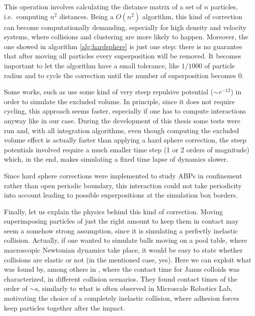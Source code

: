 \documentclass[../../master_thesis_np.tex]{subfiles}
\begin{document}
	This operation involves calculating the distance matrix of a set of $n$ particles, i.e.~computing $n^2$ distances. Being a $O(n^2)$ algorithm, this kind of correction can become computationally demanding, especially for high density and velocity systems, where collisions and clustering are more likely to happen. Moreover, the one showed in algorithm \ref{alg:hardsphere} is just one step: there is no guarantee that after moving all particles every superposition will be removed. It becomes important to let the algorithm have a small tolerance, like $1/1000$ of particle radius and to cycle the correction until the number of superposition becomes $0$.
	
	Some works, such as \cite{martin-gomez_collective_2018, caprini_spontaneous_2020} use some kind of very steep repulsive potential ($\sim r^{-12}$) in order to simulate the excluded volume. In principle, since it does not require cycling, this approach seems faster, especially if one has to compute interactions anyway like in our case. During the development of this thesis some tests were run and, with all integration algorithms, even though computing the excluded volume effect is actually faster than applying a hard sphere correction, the steep potentials involved require a much smaller time step (1 or 2 orders of magnitude) which, in the end, makes simulating a fixed time lapse of dynamics slower.
	
	Since hard sphere corrections were implemented to study ABPs in confinement rather than open periodic boundary, this interaction could not take periodicity into account leading to possible superpositions at the simulation box borders.
	
	Finally, let us explain the physics behind this kind of correction. Moving superimposing particles of just the right amount to keep them in contact may seem a somehow strong assumption, since it is simulating a perfectly inelastic collision. Actually, if one wanted to simulate balls moving on a pool table, where macroscopic Newtonian dynamics take place, it would be easy to state whether collisions are elastic or not (in the mentioned case, yes). Here we can exploit what was found by, among others \citeauthor{singh_pair_2024} in \cite{singh_pair_2024}, where the contact time for Janus colloids was characterized, in different collision scenarios. They found contact times of the order of $\sim \text{s}$, similarly to what is often observed in Microscale Robotics Lab, motivating the choice of a completely inelastic collision, where adhesion forces keep particles together after the impact. 
\end{document}
